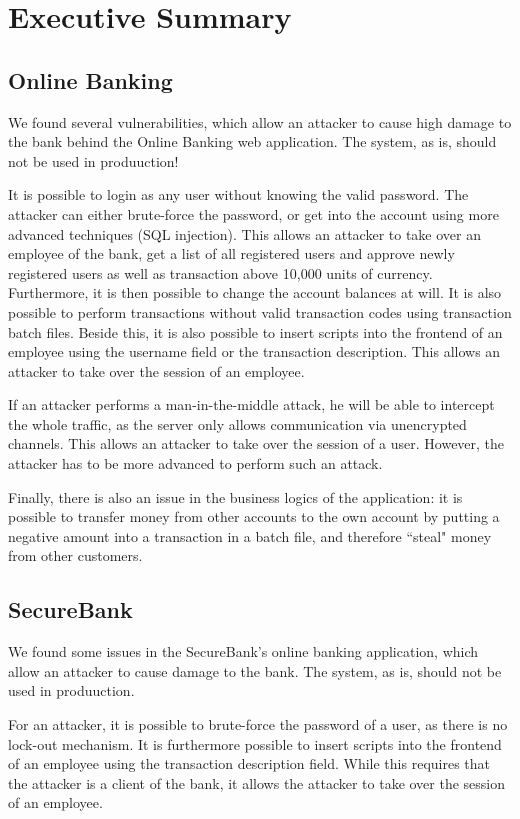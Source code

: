 \chapter{Executive Summary}

\section{Online Banking}
We found several vulnerabilities, which allow an attacker to cause high damage to the bank behind the Online Banking web application. The system, as is, should not be used in produuction!

It is possible to login as any user without knowing the valid password. The attacker can either brute-force the password, or get into the account using more advanced techniques (SQL injection). This allows an attacker to take over an employee of the bank, get a list of all registered users and approve newly registered users as well as transaction above 10,000 units of currency. Furthermore, it is then possible to change the account balances at will. It is also possible to perform transactions without valid transaction codes using transaction batch files. Beside this, it is also possible to insert scripts into the frontend of an employee using the username field or the transaction description. This allows an attacker to take over the session of an employee.

If an attacker performs a man-in-the-middle attack, he will be able to intercept the whole traffic, as the server only allows communication via unencrypted channels. This allows an attacker to take over the session of a user. However, the attacker has to be more advanced to perform such an attack.

Finally, there is also an issue in the business logics of the application: it is possible to transfer money from other accounts to the own account by putting a negative amount into a transaction in a batch file, and therefore ``steal" money from other customers.

\section{SecureBank}
We found some issues in the SecureBank's online banking application, which allow an attacker to cause damage to the bank. The system, as is, should not be used in produuction.

For an attacker, it is possible to brute-force the password of a user, as there is no lock-out mechanism. It is furthermore possible to insert scripts into the frontend of an employee using the transaction description field. While this requires that the attacker is a client of the bank, it allows the attacker to take over the session of an employee.

